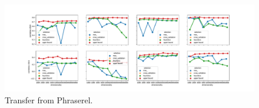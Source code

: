 \begin{figure}[b]
  \centering
    \includegraphics[width=\textwidth]{supplement/figures/PhraseRel-transfer}
    \caption{Transfer from Phraserel.}
    \label{fig:phraserel-transfer}
\end{figure}

